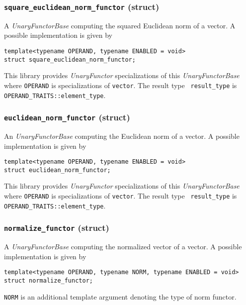 \documentclass[oneside]{book}
\begin{document}
\subsubsection{\texttt{square\_euclidean\_norm\_functor} (struct)}
A \textit{UnaryFunctorBase} computing the squared Euclidean norm of a vector.
A possible implementation is given by
\begin{verbatim}
template<typename OPERAND, typename ENABLED = void>
struct square_euclidean_norm_functor;
\end{verbatim}

This library provides \textit{UnaryFunctor} specializations of this \textit{UnaryFunctorBase}
where \texttt{OPERAND} is specializations of \texttt{vector}. The result type        \texttt{
result\_type} is \texttt{OPERAND\_TRAITS::element\_type\textrangle}.

\subsubsection{\texttt{euclidean\_norm\_functor} (struct)}
An \textit{UnaryFunctorBase} computing the Euclidean norm of a vector.
A possible implementation is given by
\begin{verbatim}
template<typename OPERAND, typename ENABLED = void>
struct euclidean_norm_functor;
\end{verbatim}

This library provides \textit{UnaryFunctor} specializations of this \textit{UnaryFunctorBase}
where \texttt{OPERAND} is specializations of \texttt{vector}. The result type        \texttt{
result\_type} is \texttt{OPERAND\_TRAITS::element\_type}.

\subsubsection{\texttt{normalize\_functor} (struct)}
A \textit{UnaryFunctorBase} computing the normalized vector of a vector.
A possible implementation is given by
\begin{verbatim}
template<typename OPERAND, typename NORM, typename ENABLED = void>
struct normalize_functor;
\end{verbatim}
\texttt{NORM} is an additional template argument denoting the type of norm functor.\newline
\end{document}
